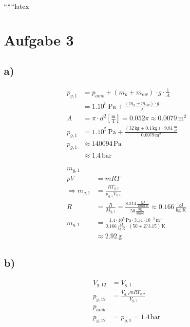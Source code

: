 
``````latex


\section*{Aufgabe 3}

\subsection*{a)}

\begin{align*}
p_{g,1} &= p_{amb} + (m_k + m_{ew}) \cdot g \cdot \frac{1}{A} \\
&= 1.10^5 \, \text{Pa} + \frac{(m_k + m_{ew}) \cdot g}{A} \\
A &= \pi \cdot d^2 \left[ \frac{\text{m}}{4} \right] = 0.052 \pi \approx 0.0079 \, \text{m}^2 \\
p_{g,1} &= 1.10^5 \, \text{Pa} + \frac{(32 \, \text{kg} + 0.1 \, \text{kg}) \cdot 9.81 \, \frac{\text{m}}{\text{s}^2}}{0.0079 \, \text{m}^2} \\
p_{g,1} &\approx 140094 \, \text{Pa} \\
&\approx 1.4 \, \text{bar}
\end{align*}

\begin{align*}
m_{g,1} \\
pV &= mRT \\
\Rightarrow m_{g,1} &= \frac{RT_{g,1}}{p_{g,1} V_{g,1}} \\
R &= \frac{R}{M_{g,1}} = \frac{8.314 \, \frac{\text{kJ}}{\text{kmol K}}}{50 \, \frac{\text{kg}}{\text{kmol}}} \approx 0.166 \, \frac{\text{kJ}}{\text{kg K}} \\
m_{g,1} &= \frac{1.4 \cdot 10^5 \, \text{Pa} \cdot 3.14 \cdot 10^{-3} \, \text{m}^3}{0.166 \, \frac{\text{kJ}}{\text{kg K}} \cdot (50 + 273.15) \, \text{K}} \\
&\approx 2.92 \, \text{g}
\end{align*}

\subsection*{b)}

\begin{align*}
V_{g,12} &= V_{g,1} \\
p_{g,12} &= \frac{V_{g,1} mRT_{g,2}}{V_{g,1}} \\
p_{amb} \\
p_{g,12} &= p_{g,1} = 1.4 \, \text{bar}
\end{align*}

